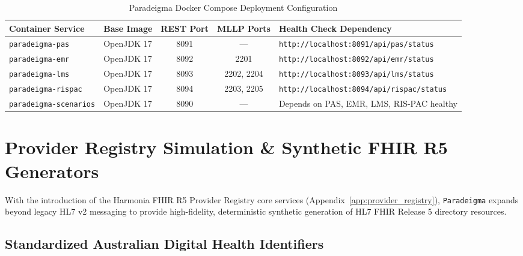 \begin{table}[htbp]
\centering
\small
\begin{tabularx}{\textwidth}{l l c c p{4.0cm}}
\toprule
\textbf{Container Service} & \textbf{Base Image} & \textbf{REST Port} & \textbf{MLLP Ports} & \textbf{Health Check Dependency} \\
\midrule
\texttt{paradeigma-pas} & OpenJDK 17 & 8091 & --- & \texttt{http://localhost:8091/api/pas/status} \\
\texttt{paradeigma-emr} & OpenJDK 17 & 8092 & 2201 & \texttt{http://localhost:8092/api/emr/status} \\
\texttt{paradeigma-lms} & OpenJDK 17 & 8093 & 2202, 2204 & \texttt{http://localhost:8093/api/lms/status} \\
\texttt{paradeigma-rispac} & OpenJDK 17 & 8094 & 2203, 2205 & \texttt{http://localhost:8094/api/rispac/status} \\
\texttt{paradeigma-scenarios} & OpenJDK 17 & 8090 & --- & Depends on PAS, EMR, LMS, RIS-PAC healthy \\
\bottomrule
\end{tabularx}
\caption{Paradeigma Docker Compose Deployment Configuration}
\label{tab:paradeigma_containers}
\end{table}

\section{Provider Registry Simulation \& Synthetic FHIR R5 Generators}
\label{sec:paradeigma_provider_registry}

With the introduction of the Harmonia FHIR R5 Provider Registry core services (Appendix~\ref{app:provider_registry}), \texttt{Paradeigma} expands beyond legacy HL7 v2 messaging to provide high-fidelity, deterministic synthetic generation of HL7 FHIR Release 5 directory resources.

\subsection{Standardized Australian Digital Health Identifiers}

